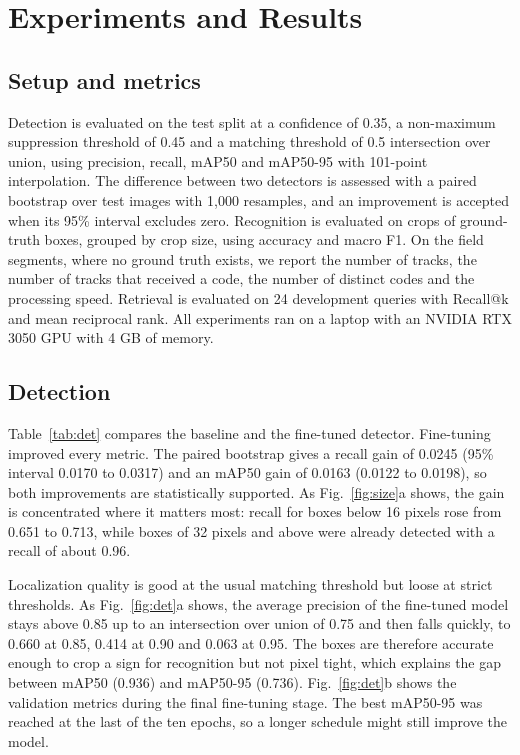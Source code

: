 \documentclass[conference,a4paper]{IEEEtran}
\begin{document}
\section{Experiments and Results}\label{sec:exp}

\subsection{Setup and metrics}

Detection is evaluated on the test split at a confidence of 0.35, a non-maximum suppression threshold of 0.45 and a matching threshold of 0.5 intersection over union, using precision, recall, mAP50 and mAP50-95 with 101-point interpolation. The difference between two detectors is assessed with a paired bootstrap over test images with 1,000 resamples, and an improvement is accepted when its 95\% interval excludes zero. Recognition is evaluated on crops of ground-truth boxes, grouped by crop size, using accuracy and macro F1. On the field segments, where no ground truth exists, we report the number of tracks, the number of tracks that received a code, the number of distinct codes and the processing speed. Retrieval is evaluated on 24 development queries with Recall@k and mean reciprocal rank. All experiments ran on a laptop with an NVIDIA RTX 3050 GPU with 4 GB of memory.

\subsection{Detection}

Table~\ref{tab:det} compares the baseline and the fine-tuned detector. Fine-tuning improved every metric. The paired bootstrap gives a recall gain of 0.0245 (95\% interval 0.0170 to 0.0317) and an mAP50 gain of 0.0163 (0.0122 to 0.0198), so both improvements are statistically supported. As Fig.~\ref{fig:size}a shows, the gain is concentrated where it matters most: recall for boxes below 16 pixels rose from 0.651 to 0.713, while boxes of 32 pixels and above were already detected with a recall of about 0.96.

Localization quality is good at the usual matching threshold but loose at strict thresholds. As Fig.~\ref{fig:det}a shows, the average precision of the fine-tuned model stays above 0.85 up to an intersection over union of 0.75 and then falls quickly, to 0.660 at 0.85, 0.414 at 0.90 and 0.063 at 0.95. The boxes are therefore accurate enough to crop a sign for recognition but not pixel tight, which explains the gap between mAP50 (0.936) and mAP50-95 (0.736). Fig.~\ref{fig:det}b shows the validation metrics during the final fine-tuning stage. The best mAP50-95 was reached at the last of the ten epochs, so a longer schedule might still improve the model.
\end{document}
